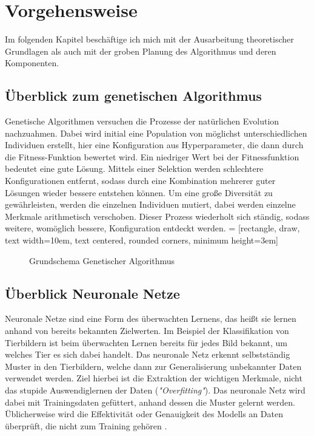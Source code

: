 \chapter{Vorgehensweise} 
Im folgenden Kapitel beschäftige ich mich mit der Ausarbeitung theoretischer Grundlagen als auch mit der groben Planung des Algorithmus und deren Komponenten.
\section{Überblick zum genetischen Algorithmus}
Genetische Algorithmen versuchen die Prozesse der natürlichen Evolution nachzuahmen. Dabei wird initial eine Population von möglichst unterschiedlichen Individuen erstellt, hier eine Konfiguration aus Hyperparameter, die dann durch die Fitness-Funktion bewertet wird. Ein niedriger Wert bei der Fitnessfunktion bedeutet eine gute Lösung. Mittels einer Selektion werden schlechtere Konfigurationen entfernt, sodass durch eine Kombination mehrerer guter Lösungen wieder bessere entstehen können. Um eine große Diversität zu gewährleisten, werden die einzelnen Individuen mutiert, dabei werden einzelne Merkmale arithmetisch verschoben. Dieser Prozess wiederholt sich ständig, sodass weitere, womöglich bessere, Konfiguration entdeckt werden.
 = [rectangle, draw, text width=10em, text centered, rounded corners, minimum height=3em]
\begin{figure}[h]
	\centering
	\caption{Grundschema Genetischer Algorithmus \parencite[Seite 5]{stelldinger_naturanaloge_2024}}
\end{figure}
\section{Überblick Neuronale Netze}
Neuronale Netze sind eine Form des überwachten Lernens, das heißt sie lernen anhand von bereits bekannten Zielwerten. Im Beispiel der Klassifikation von Tierbildern ist beim überwachten Lernen bereits für jedes Bild bekannt, um welches Tier es sich dabei handelt. Das neuronale Netz erkennt selbstständig Muster in den Tierbildern, welche dann zur Generalisierung unbekannter Daten verwendet werden. Ziel hierbei ist die Extraktion der wichtigen Merkmale, nicht das stupide Auswendiglernen der Daten (\textit{"Overfitting"}). Das neuronale Netz wird dabei mit Trainingsdaten gefüttert, anhand dessen die Muster gelernt werden. Üblicherweise wird die Effektivität oder Genauigkeit des Modells an Daten überprüft, die nicht zum Training gehören \parencite{sonnet_neuronale_2022}.
